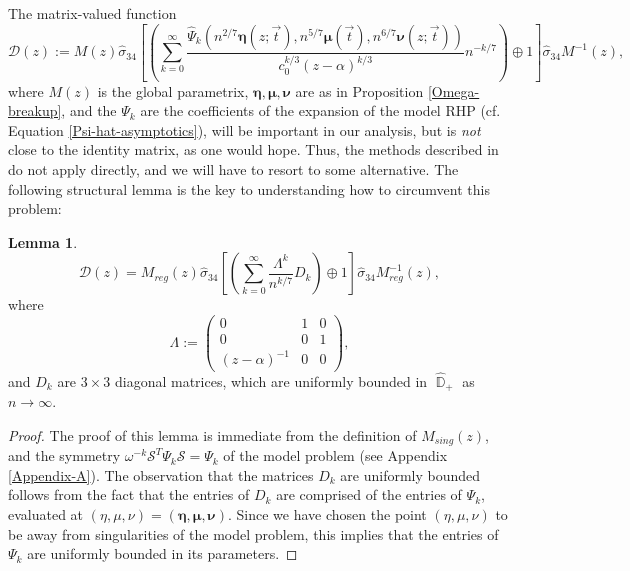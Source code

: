 \documentclass[usenames,dvipsnames]{article}
\theoremstyle{definition}
\newtheorem{lemma}{Lemma}[section]
\DeclareMathOperator{\DD}{\mathbb{D}}
\numberwithin{equation}{section}
\numberwithin{figure}{section}
\begin{document}
The matrix-valued function
    \begin{equation}\label{D-matrix}
        \mathcal{D}(z) := M(z)\hat{\sigma}_{34}\left[\left(\sum_{k=0}^{\infty}\frac{\hat{\Psi}_k(n^{2/7}\boldsymbol{\eta}(z;\vec{t}),n^{5/7}\boldsymbol{\mu}(\vec{t}),n^{6/7}\boldsymbol{\nu}(z;\vec{t}))}{c_0^{k/3}(z-\alpha)^{k/3}} n^{-k/7}\right)\oplus 1\right]\hat{\sigma}_{34}M^{-1}(z),
    \end{equation}
where $M(z)$ is the global parametrix, $\boldsymbol{\eta},\boldsymbol{\mu},\boldsymbol{\nu}$ are as in Proposition \ref{Omega-breakup}, and the
$\Psi_k$ are the coefficients of the expansion of the model RHP (cf. Equation \eqref{Psi-hat-asymptotics}), will be important in our analysis, but is \textit{not} close to the identity matrix, as one would hope. Thus, the methods described in \cite{DG,DKZ} do not apply directly, and we will have to resort to some alternative. 
The following structural lemma is the key to understanding how to circumvent this problem:
\begin{lemma}
        \begin{equation}\label{local-symmetry}
            \mathcal{D}(z) = M_{reg}(z)\hat{\sigma}_{34}\left[ \left(\sum_{k=0}^{\infty}\frac{\Lambda^k}{n^{k/7}} D_k\right)\oplus 1\right]\hat{\sigma}_{34}M_{reg}^{-1}(z),
        \end{equation}
    where 
        \begin{equation}\label{Lambda-matrix}
            \Lambda := 
            \begin{pmatrix}
                0 & 1 & 0\\
                0 & 0 & 1\\
                (z-\alpha)^{-1} & 0 & 0
            \end{pmatrix},
        \end{equation}
    and $D_k$ are $3\times 3$ diagonal matrices, which are uniformly bounded in $\hat{\DD}_+$ as $n\to \infty$.
\end{lemma}
    \begin{proof}
        The proof of this lemma is immediate from the definition of $M_{sing}(z)$, and the symmetry $\omega^{-k}\mathcal{S}^T\Psi_k\mathcal{S} = \Psi_k$ of the model problem (see Appendix \ref{Appendix-A}). The observation that the matrices $D_k$ are uniformly bounded follows from the fact that the entries of $D_k$ are comprised of the entries of $\Psi_k$, evaluated at $(\eta,\mu,\nu) = (\boldsymbol{\eta},\boldsymbol{\mu},\boldsymbol{\nu})$. Since we have chosen the point $(\eta,\mu,\nu)$ to be away from singularities of the model problem, this implies that the entries of $\Psi_k$ are uniformly bounded in its parameters.
    \end{proof}
\end{document}
